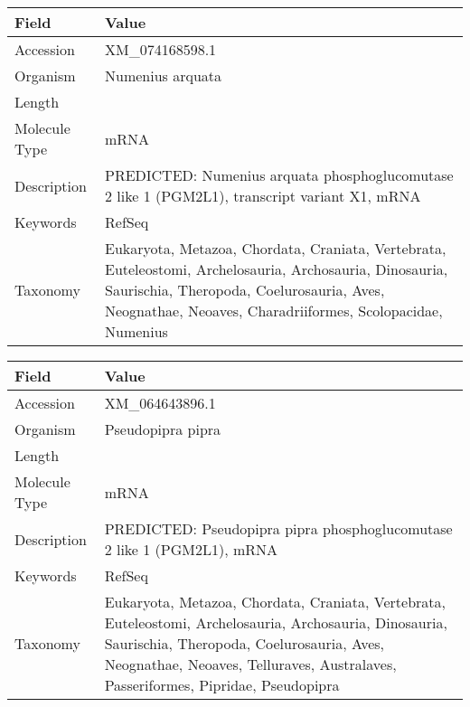 \documentclass[10pt]{article}
\begin{document}
\vspace{1em}
{\footnotesize
\begin{longtable}{>{\raggedright\arraybackslash}p{4.5cm} >{\raggedright\arraybackslash}p{11.5cm}}
\textbf{Field} & \textbf{Value} \\
\hline
Accession & XM\_074168598.1 \\
Organism & Numenius arquata \\
Length & 2036 \\
Molecule Type & mRNA \\
Description & PREDICTED: Numenius arquata phosphoglucomutase 2 like 1 (PGM2L1), transcript variant X1, mRNA \\
Keywords & RefSeq \\
Taxonomy & Eukaryota, Metazoa, Chordata, Craniata, Vertebrata, Euteleostomi, Archelosauria, Archosauria, Dinosauria, Saurischia, Theropoda, Coelurosauria, Aves, Neognathae, Neoaves, Charadriiformes, Scolopacidae, Numenius \\
\end{longtable}
}

\vspace{1em}
{\footnotesize
\begin{longtable}{>{\raggedright\arraybackslash}p{4.5cm} >{\raggedright\arraybackslash}p{11.5cm}}
\textbf{Field} & \textbf{Value} \\
\hline
Accession & XM\_064643896.1 \\
Organism & Pseudopipra pipra \\
Length & 5971 \\
Molecule Type & mRNA \\
Description & PREDICTED: Pseudopipra pipra phosphoglucomutase 2 like 1 (PGM2L1), mRNA \\
Keywords & RefSeq \\
Taxonomy & Eukaryota, Metazoa, Chordata, Craniata, Vertebrata, Euteleostomi, Archelosauria, Archosauria, Dinosauria, Saurischia, Theropoda, Coelurosauria, Aves, Neognathae, Neoaves, Telluraves, Australaves, Passeriformes, Pipridae, Pseudopipra \\
\end{longtable}
}
\end{document}
